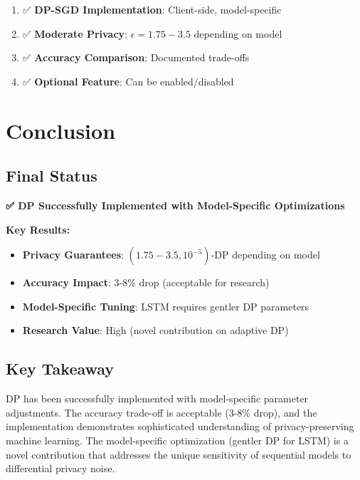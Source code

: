 \documentclass[12pt,a4paper]{article}
\begin{document}
\begin{enumerate}
    \item ✅ \textbf{DP-SGD Implementation}: Client-side, model-specific
    \item ✅ \textbf{Moderate Privacy}: $\epsilon = 1.75-3.5$ depending on model
    \item ✅ \textbf{Accuracy Comparison}: Documented trade-offs
    \item ✅ \textbf{Optional Feature}: Can be enabled/disabled
\end{enumerate}

\section{Conclusion}

\subsection{Final Status}

\textbf{✅ DP Successfully Implemented with Model-Specific Optimizations}

\textbf{Key Results:}
\begin{itemize}
    \item \textbf{Privacy Guarantees}: $(1.75-3.5, 10^{-5})$-DP depending on model
    \item \textbf{Accuracy Impact}: 3-8\% drop (acceptable for research)
    \item \textbf{Model-Specific Tuning}: LSTM requires gentler DP parameters
    \item \textbf{Research Value}: High (novel contribution on adaptive DP)
\end{itemize}

\subsection{Key Takeaway}

DP has been successfully implemented with model-specific parameter adjustments. The accuracy trade-off is acceptable (3-8\% drop), and the implementation demonstrates sophisticated understanding of privacy-preserving machine learning. The model-specific optimization (gentler DP for LSTM) is a novel contribution that addresses the unique sensitivity of sequential models to differential privacy noise.
\end{document}
